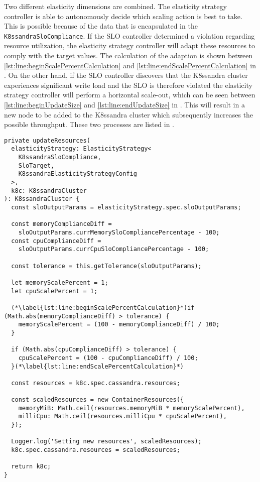 Two different elasticity dimensions are combined. The elasticity strategy controller is able to autonomously decide which scaling action is best to take. This is possible because of the data that is encapsulated in the \texttt{K8\-ssan\-dra\-Slo\-Compliance}. If the SLO controller determined a violation regarding resource utilization, the elasticity strategy controller will adapt these resources to comply with the target values. The calculation of the adaption is shown between \cref{lst:line:beginScalePercentCalculation} and \cref{lst:line:endScalePercentCalculation} in . On the other hand, if the SLO controller discovers that the K8ssandra cluster experiences significant write load and the SLO is therefore violated the elasticity strategy controller will perform a horizontal scale-out, which can be seen between \cref{lst:line:beginUpdateSize} and \cref{lst:line:endUpdateSize} in . This will result in a new node to be added to the K8ssandra cluster which subsequently increases the possible throughput. These two processes are listed in .


\begin{lstlisting}[caption={Method of diagonal elasticity strategy controller which manages vertical scaling},
                    captionpos=b,
                    label=lst:diagonal-elasticity:updateResources,
                    float]
private updateResources(
  elasticityStrategy: ElasticityStrategy<
    K8ssandraSloCompliance,
    SloTarget,
    K8ssandraElasticityStrategyConfig
  >,
  k8c: K8ssandraCluster
): K8ssandraCluster {
  const sloOutputParams = elasticityStrategy.spec.sloOutputParams;

  const memoryComplianceDiff =
    sloOutputParams.currMemorySloCompliancePercentage - 100;
  const cpuComplianceDiff =
    sloOutputParams.currCpuSloCompliancePercentage - 100;

  const tolerance = this.getTolerance(sloOutputParams);

  let memoryScalePercent = 1;
  let cpuScalePercent = 1;

  (*\label{lst:line:beginScalePercentCalculation}*)if (Math.abs(memoryComplianceDiff) > tolerance) {
    memoryScalePercent = (100 - memoryComplianceDiff) / 100;
  }

  if (Math.abs(cpuComplianceDiff) > tolerance) {
    cpuScalePercent = (100 - cpuComplianceDiff) / 100;
  }(*\label{lst:line:endScalePercentCalculation}*)

  const resources = k8c.spec.cassandra.resources;

  const scaledResources = new ContainerResources({
    memoryMiB: Math.ceil(resources.memoryMiB * memoryScalePercent),
    milliCpu: Math.ceil(resources.milliCpu * cpuScalePercent),
  });

  Logger.log('Setting new resources', scaledResources);
  k8c.spec.cassandra.resources = scaledResources;

  return k8c;
}
\end{lstlisting}

